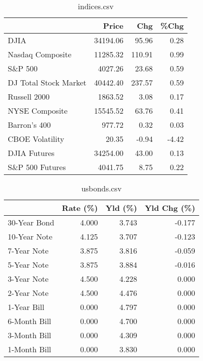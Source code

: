 \documentclass{article}%
\begin{document}
\begin{table}[htbp]%
\caption{indices.csv}%
\centering%
\begin{adjustbox}{width=1\textwidth}%
\begin{tabular}{lrrr}
\toprule
                      &    Price &    Chg &  \%Chg \\
\midrule
                 DJIA & 34194.06 &  95.96 &  0.28 \\
     Nasdaq Composite & 11285.32 & 110.91 &  0.99 \\
              S\&P 500 &  4027.26 &  23.68 &  0.59 \\
DJ Total Stock Market & 40442.40 & 237.57 &  0.59 \\
         Russell 2000 &  1863.52 &   3.08 &  0.17 \\
       NYSE Composite & 15545.52 &  63.76 &  0.41 \\
         Barron's 400 &   977.72 &   0.32 &  0.03 \\
      CBOE Volatility &    20.35 &  -0.94 & -4.42 \\
         DJIA Futures & 34254.00 &  43.00 &  0.13 \\
      S\&P 500 Futures &  4041.75 &   8.75 &  0.22 \\
\bottomrule
\end{tabular}
%
\end{adjustbox}%
\end{table}

%


\begin{table}[htbp]%
\caption{usbonds.csv}%
\centering%
\begin{adjustbox}{width=1\textwidth}%
\begin{tabular}{lrrr}
\toprule
             &  Rate (\%) &  Yld (\%) &  Yld Chg (\%) \\
\midrule
30-Year Bond &     4.000 &    3.743 &       -0.177 \\
10-Year Note &     4.125 &    3.707 &       -0.123 \\
 7-Year Note &     3.875 &    3.816 &       -0.059 \\
 5-Year Note &     3.875 &    3.884 &       -0.016 \\
 3-Year Note &     4.500 &    4.228 &        0.000 \\
 2-Year Note &     4.500 &    4.476 &        0.000 \\
 1-Year Bill &     0.000 &    4.797 &        0.000 \\
6-Month Bill &     0.000 &    4.700 &        0.000 \\
3-Month Bill &     0.000 &    4.309 &        0.000 \\
1-Month Bill &     0.000 &    3.830 &        0.000 \\
\bottomrule
\end{tabular}
%
\end{adjustbox}%
\end{table}
\end{document}
